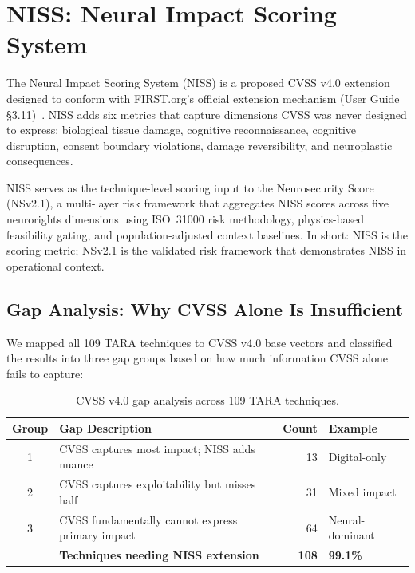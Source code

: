 
\section{NISS: Neural Impact Scoring System}
\label{sec:niss}

The Neural Impact Scoring System (NISS) is a proposed CVSS v4.0 extension
designed to conform with FIRST.org's official extension mechanism (User Guide
\S3.11)~\cite{first2023cvss4userguide}. NISS adds six metrics that capture
dimensions CVSS was never designed to express: biological tissue damage, cognitive
reconnaissance, cognitive disruption, consent boundary violations, damage
reversibility, and neuroplastic consequences.

NISS serves as the technique-level scoring input to the Neurosecurity Score
(NSv2.1), a multi-layer risk framework that aggregates NISS scores across five
neurorights dimensions using ISO~31000 risk methodology, physics-based feasibility
gating, and population-adjusted context baselines. In short: NISS is the scoring
metric; NSv2.1 is the validated risk framework that demonstrates NISS in
operational context.

\subsection{Gap Analysis: Why CVSS Alone Is Insufficient}

We mapped all 109 TARA techniques to CVSS v4.0 base vectors and classified the
results into three gap groups based on how much information CVSS alone fails to
capture:

\begin{table}[H]
\centering
\caption{CVSS v4.0 gap analysis across 109 TARA techniques.}
\label{tab:gap}
\small
\begin{tabularx}{\textwidth}{@{}c X r l@{}}
\toprule
\textbf{Group} & \textbf{Gap Description} & \textbf{Count} & \textbf{Example} \\
\midrule
1 & CVSS captures most impact; NISS adds nuance &
    13 & Digital-only \\
2 & CVSS captures exploitability but misses half &
    31 & Mixed impact \\
3 & CVSS fundamentally cannot express primary impact &
    64 & Neural-dominant \\
\midrule
  & \textbf{Techniques needing NISS extension} & \textbf{108} & \textbf{99.1\%} \\
\bottomrule
\end{tabularx}
\end{table}

